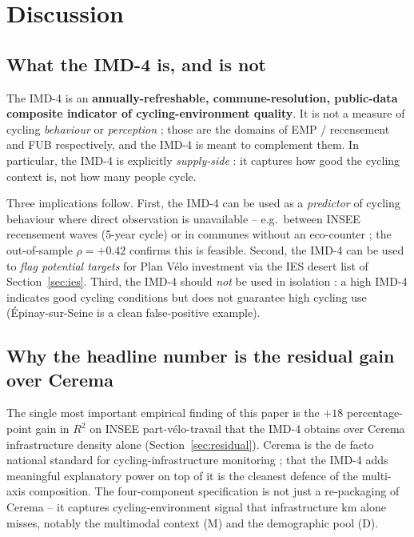 \documentclass[11pt,a4paper]{article}
\begin{document}
\section{Discussion}
\label{sec:discussion}

\subsection{What the IMD-4 is, and is not}

The IMD-4 is an \textbf{annually-refreshable, commune-resolution,
public-data composite indicator of cycling-environment quality}.  It is not a
measure of cycling \emph{behaviour} or \emph{perception} ; those
are the domains of EMP / recensement and FUB respectively, and the
IMD-4 is meant to complement them.  In particular, the IMD-4 is
explicitly \emph{supply-side} : it captures how good the cycling
context is, not how many people cycle.

Three implications follow.  First, the IMD-4 can be used as a
\emph{predictor} of cycling behaviour where direct observation is
unavailable -- e.g.\ between INSEE recensement waves (5-year
cycle) or in communes without an eco-counter ; the out-of-sample
$\rho = +0.42$ confirms this is feasible.  Second, the IMD-4 can
be used to \emph{flag potential targets} for Plan V\'elo
investment via the IES desert list of
Section~\ref{sec:ies}.  Third, the IMD-4 should \emph{not} be
used in isolation : a high IMD-4 indicates good cycling conditions
but does not guarantee high cycling use (\'Epinay-sur-Seine is a
clean false-positive example).

\subsection{Why the headline number is the residual gain over Cerema}

The single most important empirical finding of this paper is the
$+18$ percentage-point gain in $R^2$ on INSEE part-v\'elo-travail
that the IMD-4 obtains over Cerema infrastructure density alone
(Section~\ref{sec:residual}).  Cerema is the de facto national
standard for cycling-infrastructure monitoring ; that the IMD-4
adds meaningful explanatory power on top of it is the cleanest
defence of the multi-axis composition.  The four-component
specification is not just a re-packaging of Cerema -- it captures
cycling-environment signal that infrastructure km alone misses,
notably the multimodal context (M) and the demographic pool (D).
\end{document}
